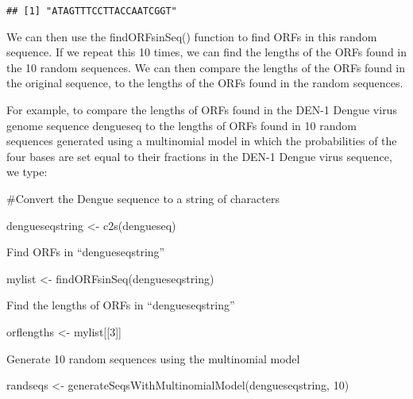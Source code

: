 \documentclass[
]{book}
\newenvironment{Shaded}{\begin{snugshade}}{\end{snugshade}}
\newcommand{\DecValTok}[1]{\textcolor[rgb]{0.00,0.00,0.81}{#1}}
\newcommand{\FunctionTok}[1]{\textcolor[rgb]{0.00,0.00,0.00}{#1}}
\newcommand{\NormalTok}[1]{#1}
\newcommand{\OtherTok}[1]{\textcolor[rgb]{0.56,0.35,0.01}{#1}}
\begin{document}
\begin{verbatim}
## [1] "ATAGTTTCCTTACCAATCGGT"
\end{verbatim}

We can then use the findORFsinSeq() function to find ORFs in this random sequence. If we repeat this 10 times, we can find the lengths of the ORFs found in the 10 random sequences. We can then compare the lengths of the ORFs found in the original sequence, to the lengths of the ORFs found in the random sequences.

For example, to compare the lengths of ORFs found in the DEN-1 Dengue virus genome sequence dengueseq to the lengths of ORFs found in 10 random sequences generated using a multinomial model in which the probabilities of the four bases are set equal to their fractions in the DEN-1 Dengue virus sequence, we type:

\#Convert the Dengue sequence to a string of characters

\begin{Shaded}
\begin{Highlighting}[]
\NormalTok{dengueseqstring }\OtherTok{\textless{}{-}} \FunctionTok{c2s}\NormalTok{(dengueseq)   }
\end{Highlighting}
\end{Shaded}

Find ORFs in ``dengueseqstring''

\begin{Shaded}
\begin{Highlighting}[]
\NormalTok{mylist }\OtherTok{\textless{}{-}} \FunctionTok{findORFsinSeq}\NormalTok{(dengueseqstring)  }
\end{Highlighting}
\end{Shaded}

Find the lengths of ORFs in ``dengueseqstring''

\begin{Shaded}
\begin{Highlighting}[]
\NormalTok{orflengths }\OtherTok{\textless{}{-}}\NormalTok{ mylist[[}\DecValTok{3}\NormalTok{]]  }
\end{Highlighting}
\end{Shaded}

Generate 10 random sequences using the multinomial model

\begin{Shaded}
\begin{Highlighting}[]
\NormalTok{randseqs }\OtherTok{\textless{}{-}} \FunctionTok{generateSeqsWithMultinomialModel}\NormalTok{(dengueseqstring, }\DecValTok{10}\NormalTok{) }
\end{Highlighting}
\end{Shaded}
\end{document}
